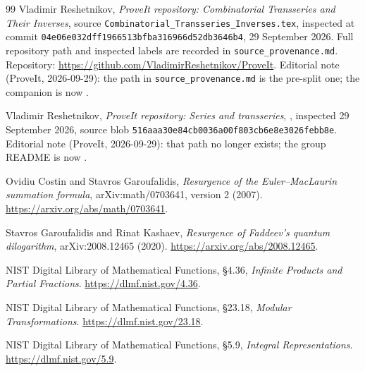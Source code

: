 \documentclass[11pt,a4paper]{article}
\numberwithin{equation}{section}
\theoremstyle{definition}\newtheorem{definition}[theorem]{Definition}
\theoremstyle{remark}\newtheorem{remark}[theorem]{Remark}
\begin{document}
\clearpage
{}
{}
\begin{thebibliography}{99}
Vladimir Reshetnikov, \emph{ProveIt repository: Combinatorial Transseries and
Their Inverses}, source
\texttt{Combinatorial\_Transseries\_Inverses.tex}, inspected at commit
\texttt{04e06e032dff1966513bfba316966d52db3646b4}, 29 September 2026.
Full repository path and inspected labels are recorded in
\texttt{source\_provenance.md}. Repository:
\url{https://github.com/VladimirReshetnikov/ProveIt}.
Editorial note (ProveIt, 2026-09-29): the path in \texttt{source\_provenance.md}
is the pre-split one; the companion is now
.

Vladimir Reshetnikov, \emph{ProveIt repository: Series and transseries},
, inspected 29 September 2026,
source blob \texttt{516aaa30e84cb0036a00f803cb6e8e3026febb8e}.
Editorial note (ProveIt, 2026-09-29): that path no longer exists; the group
README is now .

Ovidiu Costin and Stavros Garoufalidis,
\emph{Resurgence of the Euler--MacLaurin summation formula},
arXiv:math/0703641, version 2 (2007).
\url{https://arxiv.org/abs/math/0703641}.

Stavros Garoufalidis and Rinat Kashaev,
\emph{Resurgence of Faddeev's quantum dilogarithm},
arXiv:2008.12465 (2020).
\url{https://arxiv.org/abs/2008.12465}.

NIST Digital Library of Mathematical Functions,
\S4.36, \emph{Infinite Products and Partial Fractions}.
\url{https://dlmf.nist.gov/4.36}.

NIST Digital Library of Mathematical Functions,
\S23.18, \emph{Modular Transformations}.
\url{https://dlmf.nist.gov/23.18}.

NIST Digital Library of Mathematical Functions,
\S5.9, \emph{Integral Representations}.
\url{https://dlmf.nist.gov/5.9}.


\end{thebibliography}
\end{document}
